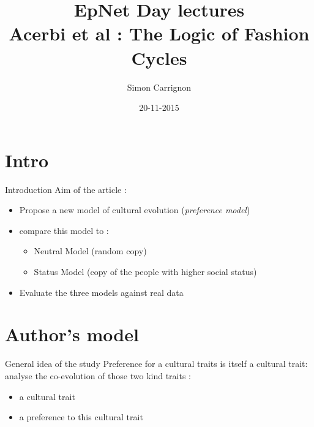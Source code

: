 \documentclass{beamer}
\title{EpNet Day lectures\\
    Acerbi et al : The Logic of Fashion Cycles
}
\author{Simon Carrignon}
\date{20-11-2015}
\begin{document}
\begin{frame}
    
\maketitle
\end{frame}
\section{Intro}
\begin{frame}{Introduction}
    Aim of the article :

    \begin{itemize}
	\item Propose a new model of cultural evolution (\emph{preference model})
	\item compare this model to :
	    \begin{itemize}
		\item Neutral Model (random copy)
		\item Status Model (copy of the people with higher social status)
	    \end{itemize}
	\item Evaluate the three models against real data
    \end{itemize}
\end{frame}
\section{Author's model}
\begin{frame}
    \begin{block}{General idea of the study}
	Preference for a cultural traits is itself a cultural trait: analyse the co-evolution of those two kind traits :
	\begin{itemize}
	    \item a cultural trait
	    \item a preference to this cultural trait
	\end{itemize}
    \end{block}
\end{frame}
\end{document}

